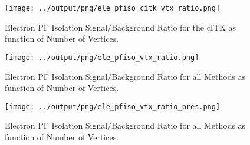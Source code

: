 \documentclass[11pt]{book}
\begin{document}
\begin{figure}[htb]
\centering
\texttt{[image: ../output/png/ele\_pfiso\_citk\_vtx\_ratio.png]}
\caption{Electron PF Isolation Signal/Background Ratio for the cITK as function of Number of Vertices.}
\label{fig:ele_pfiso_vtx_ratio_citk}
\end{figure}

\begin{figure}[htb]
\centering
\texttt{[image: ../output/png/ele\_pfiso\_vtx\_ratio.png]}
\caption{Electron PF Isolation Signal/Background Ratio for all Methods as function of Number of Vertices.}
\label{fig:ele_pfiso_vtx_ratio}
\end{figure}

\begin{figure}[htb]
\centering
\texttt{[image: ../output/png/ele\_pfiso\_vtx\_ratio\_pres.png]}
\caption{Electron PF Isolation Signal/Background Ratio for all Methods as function of Number of Vertices.}
\label{fig:ele_pfiso_vtx_ratio_pres}
\end{figure}
\clearpage


\end{document}
